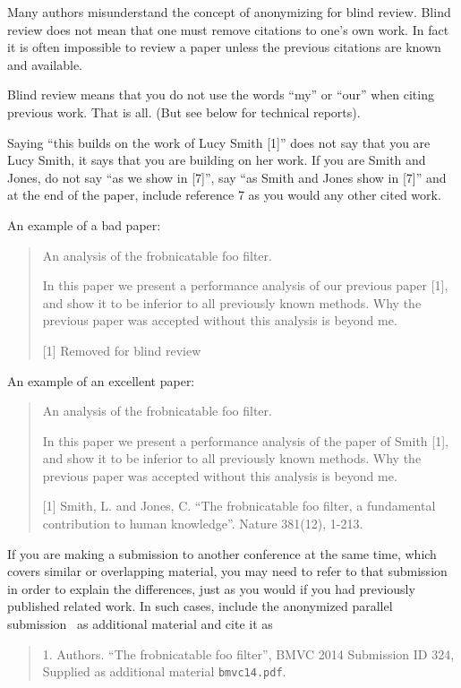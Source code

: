 \documentclass[runningheads]{llncs}
\begin{document}
Many authors misunderstand the concept of anonymizing for blind
review.  Blind review does not mean that one must remove
citations to one's own work. In fact it is often impossible to
review a paper unless the previous citations are known and
available.

Blind review means that you do not use the words ``my'' or ``our''
when citing previous work.  That is all.  (But see below for
technical reports).

Saying ``this builds on the work of Lucy Smith [1]'' does not say
that you are Lucy Smith, it says that you are building on her
work.  If you are Smith and Jones, do not say ``as we show in
[7]'', say ``as Smith and Jones show in [7]'' and at the end of the
paper, include reference 7 as you would any other cited work.

An example of a bad paper:
\begin{quote}
\begin{center}
    An analysis of the frobnicatable foo filter.
\end{center}

   In this paper we present a performance analysis of our
   previous paper [1], and show it to be inferior to all
   previously known methods.  Why the previous paper was
   accepted without this analysis is beyond me.

   [1] Removed for blind review
\end{quote}


An example of an excellent paper:

\begin{quote}
\begin{center}
     An analysis of the frobnicatable foo filter.
\end{center}

   In this paper we present a performance analysis of the
   paper of Smith [1], and show it to be inferior to
   all previously known methods.  Why the previous paper
   was accepted without this analysis is beyond me.

   [1] Smith, L. and Jones, C. ``The frobnicatable foo
   filter, a fundamental contribution to human knowledge''.
   Nature 381(12), 1-213.
\end{quote}

If you are making a submission to another conference at the same
time, which covers similar or overlapping material, you may need
to refer to that submission in order to explain the differences,
just as you would if you had previously published related work. In
such cases, include the anonymized parallel
submission~\cite{Authors14} as additional material and cite it as
\begin{quote}
1. Authors. ``The frobnicatable foo filter'', BMVC 2014 Submission
ID 324, Supplied as additional material {\tt bmvc14.pdf}.
\end{quote}
\end{document}
